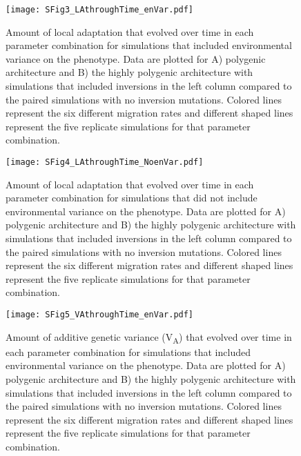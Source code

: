 \documentclass[10pt, scrartlc]{article}
\begin{document}
\begin{figure}[h]
	\begin{center}
		\texttt{[image: SFig3\_LAthroughTime\_enVar.pdf]}
	\end{center}
	\caption[Supplementary Figure 3: Local Adaptation Through Time (environmental variance)]{Amount of local adaptation that evolved over time in each parameter combination for simulations that included environmental variance on the phenotype. Data are plotted for A) polygenic architecture and B) the highly polygenic architecture with simulations that included inversions in the left column compared to the paired simulations with no inversion mutations. Colored lines represent the six different migration rates and different shaped lines represent the five replicate simulations for that parameter combination. }
\end{figure}

\clearpage
\newpage

\begin{figure}[h]
	\begin{center}
		\texttt{[image: SFig4\_LAthroughTime\_NoenVar.pdf]}
	\end{center}
	\caption[Supplementary Figure 4: Local Adaptation Through Time (no environmental variance)]{Amount of local adaptation that evolved over time in each parameter combination for simulations that did not include environmental variance on the phenotype. Data are plotted for A) polygenic architecture and B) the highly polygenic architecture with simulations that included inversions in the left column compared to the paired simulations with no inversion mutations. Colored lines represent the six different migration rates and different shaped lines represent the five replicate simulations for that parameter combination. }
\end{figure}

\clearpage
\newpage


\begin{figure}[h]
	\begin{center}
		\texttt{[image: SFig5\_VAthroughTime\_enVar.pdf]}
	\end{center}
	\caption[Supplementary Figure 5: Additive Genetic Variance (environmental variance)]{Amount of additive genetic variance (V\textsubscript{A}) that evolved over time in each parameter combination for simulations that included environmental variance on the phenotype. Data are plotted for A) polygenic architecture and B) the highly polygenic architecture with simulations that included inversions in the left column compared to the paired simulations with no inversion mutations. Colored lines represent the six different migration rates and different shaped lines represent the five replicate simulations for that parameter combination. }
\end{figure}
\end{document}
